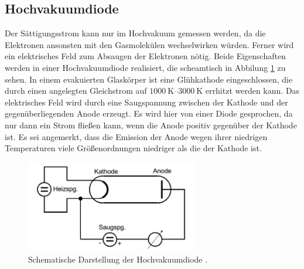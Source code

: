 \subsection{Hochvakuumdiode}
\label{sec:diode}
Der Sättigungsstrom kann nur im Hochvakuum gemessen werden, da die Elektronen ansonsten mit den Gasmolekülen wechselwirken würden.
Ferner wird ein elektrisches Feld zum Absaugen der Elektronen nötig.
Beide Eigenschaften werden in einer Hochvakuumdiode realisiert, die scheamtisch in Abbilung \ref{fig:hochvakuumdiode} zu sehen.
In einem evakuierten Glaskörper ist eine Glühkathode eingeschlossen, 
die durch einen angelegten Gleichstrom auf $\qtyrange[]{1000}{3000}{\kelvin}$ errhitzt werden kann.
Das elektrisches Feld wird durch eine Saugspannung zwischen der Kathode und der gegenüberliegenden Anode erzeugt.
Es wird hier von einer Diode gesprochen, da nur dann ein Strom fließen kann, wenn die Anode positiv gegenüber der Kathode ist.
Es sei angemerkt, dass die Emission der Anode wegen ihrer niedrigen Temperaturen viele Größenordnungen niedriger als die der Kathode ist.

\begin{figure}[H]
    \centering
    \includegraphics[height = 4cm]{Abbildungen/hochvakuum_diode.png}
    \caption[]{Schematische Darstellung der Hochvakuumdiode \cite{man:v504}.}
    \label{fig:hochvakuumdiode}
\end{figure}



